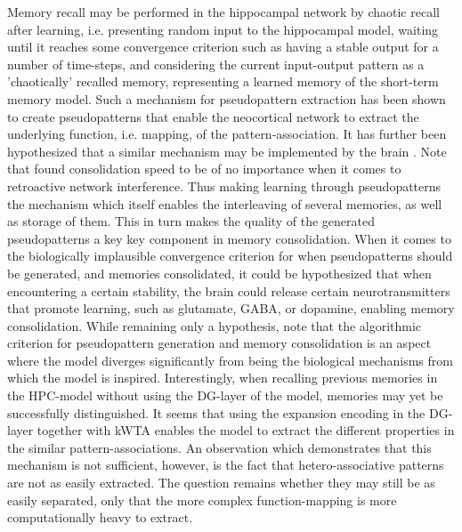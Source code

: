Memory recall may be performed in the hippocampal network by chaotic recall after learning, i.e. presenting random input to the hippocampal model, waiting until it reaches some convergence criterion such as having a stable output for a number of time-steps, and considering the current input-output pattern as a 'chaotically' recalled memory, representing a learned memory of the short-term memory model. 
Such a mechanism for pseudopattern extraction has been shown to create pseudopatterns that enable the neocortical network to extract the underlying function, i.e. mapping, of the pattern-association. It has further been hypothesized that a similar mechanism may be implemented by the brain \citep{French2001, Ans1997}. Note that \cite{French2001} found consolidation speed to be of no importance when it comes to retroactive network interference. Thus making learning through pseudopatterns the mechanism which itself enables the interleaving of several memories, as well as storage of them. This in turn makes the quality of the generated pseudopatterns a key key component in memory consolidation.
When it comes to the biologically implausible convergence criterion for when pseudopatterns should be generated, and memories consolidated, it could be hypothesized that when encountering a certain stability, the brain could release certain neurotransmitters that promote learning, such as glutamate, GABA, or dopamine, enabling memory consolidation. While remaining only a hypothesis, note that the algorithmic criterion for pseudopattern generation and memory consolidation is an aspect where the model diverges significantly from being the biological mechanisms from which the model is inspired.
Interestingly, when recalling previous memories in the HPC-model without using the DG-layer of the model, memories may yet be successfully distinguished. It seems that using the expansion encoding in the DG-layer together with kWTA enables the model to extract the different properties in the similar pattern-associations. An observation which demonstrates that this mechanism is not sufficient, however, is the fact that hetero-associative patterns are not as easily extracted. The question remains whether they may still be as easily separated, only that the more complex function-mapping is more computationally heavy to extract.

